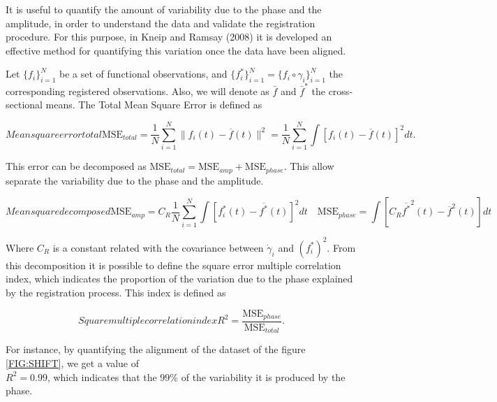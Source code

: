 It is useful to quantify the amount of variability due to the phase and the
amplitude, in order to understand the data and validate the registration
procedure. For this purpose, in Kneip and Ramsay (2008)
\cite{RamsayAlois2008} it is developed an effective method for quantifying
this variation once the data have been aligned.

Let $\{f_i\}_{i=1}^N$ be a set of functional observations, and
$\{f^*_i\}_{i=1}^N = \{f_i \circ \gamma_i\}_{i=1}^N$ the corresponding registered
observations. Also, we will denote as $\bar f$ and $\bar f^*$ the
cross-sectional means. The Total Mean Square Error is defined as

\begin{equation}[]{Mean square error total}
\text{MSE}_{total}=  \frac{1}{N}\sum_{i=1}^{N} \|f_i(t)-\overline f(t)\|^2 =
\frac{1}{N}\sum_{i=1}^{N}\int[f_i(t)-\overline f(t)]^2dt .
\end{equation}

This error can be decomposed as
$\text{MSE}_{total} = \text{MSE}_{amp} + \text{MSE}_{phase}$. This allow separate
the variability due to the phase and the amplitude.

\begin{equation}[]{Mean square decomposed}
\text{MSE}_{amp} =  C_R \frac{1}{N}
        \sum_{i=1}^{N} \int \left [ f^*_i(t) - \overline{f^*}(t) \right ]^2 dt \quad
\text{MSE}_{phase}=
        \int \left [C_R \overline{f^*}^2(t) - \overline{f}^2(t) \right]dt
\end{equation}


Where $C_R$ is a constant related with the covariance between $\dot \gamma_i$
and $(f_i^*)^2$.
From this decomposition it is possible to define the
square error multiple correlation index, which indicates the proportion of the
variation due to the phase
explained by the registration process. This index is defined as

\begin{equation}[]{Square multiple correlation index}
R^2 = \frac{\text{MSE}_{phase}}{\text{MSE}_{total}}.
\end{equation}

For instance, by quantifying the alignment of the dataset of the figure
\ref{FIG:SHIFT}, we get a value of \\ $R^2=0.99$, which indicates that the $99\%$ of
the variability it is produced by the phase.
